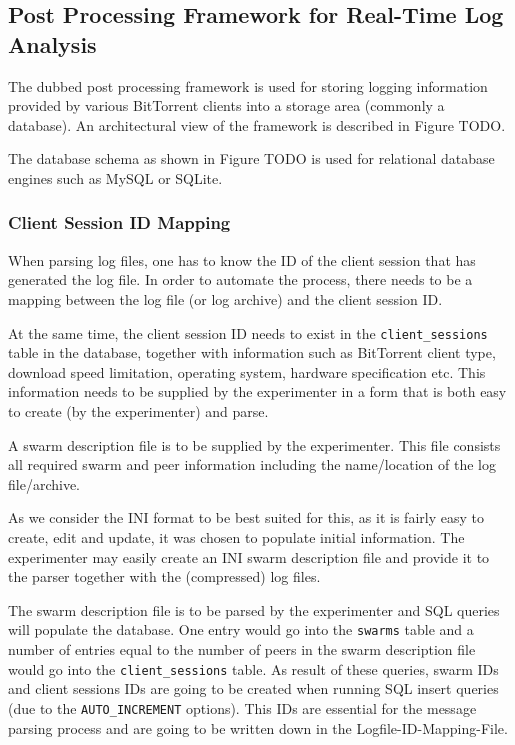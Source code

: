 \subsection{Post Processing Framework for Real-Time Log Analysis}

The dubbed post processing framework is used for storing logging information
provided by various BitTorrent clients into a storage area (commonly a
database). An architectural view of the framework is described in Figure TODO.


The database schema as shown in Figure TODO is used for relational database
engines such as MySQL or SQLite.


\subsubsection{Client Session ID Mapping}

When parsing log files, one has to know the ID of the client session that has
generated the log file. In order to automate the process, there needs to be a
mapping between the log file (or log archive) and the client session ID.

At the same time, the client session ID needs to exist in the
\texttt{client\_sessions} table in the database, together with information
such as BitTorrent client type, download speed limitation, operating system,
hardware specification etc. This information needs to be supplied by the
experimenter in a form that is both easy to create (by the experimenter) and
parse.

A swarm description file is to be supplied by the experimenter. This file consists all required swarm and peer information including the name/location of the log file/archive.

As we consider the INI format to be best suited for this, as it is fairly easy
to create, edit and update, it was chosen to populate initial information. The
experimenter may easily create an INI swarm description file and provide it to
the parser together with the (compressed) log files.

The swarm description file is to be parsed by the experimenter and SQL queries
will populate the database. One entry would go into the \texttt{swarms} table
and a number of entries equal to the number of peers in the swarm description
file would go into the \texttt{client\_sessions} table. As result of these
queries, swarm IDs and client sessions IDs are going to be created when
running SQL insert queries (due to the \texttt{AUTO\_INCREMENT} options). This
IDs are essential for the message parsing process and are going to be written
down in the Logfile-ID-Mapping-File.

